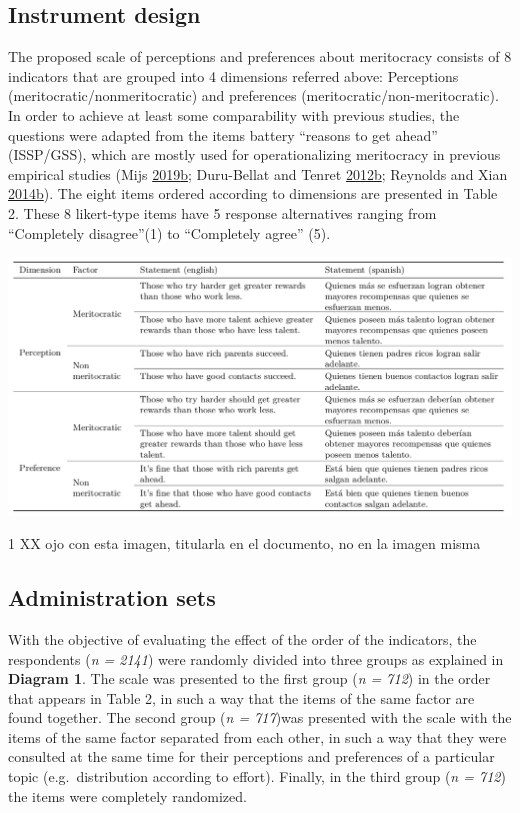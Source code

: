 \documentclass[
]{article}
\begin{document}
\hypertarget{instrument-design}{%
\subsection{Instrument design}\label{instrument-design}}

The proposed scale of perceptions and preferences about meritocracy
consists of 8 indicators that are grouped into 4 dimensions referred
above: Perceptions (meritocratic/nonmeritocratic) and preferences
(meritocratic/non-meritocratic). In order to achieve at least some
comparability with previous studies, the questions were adapted from the
items battery ``reasons to get ahead'' (ISSP/GSS), which are mostly used
for operationalizing meritocracy in previous empirical studies (Mijs
\protect\hyperlink{ref-mijs_paradox_2019}{2019}\protect\hyperlink{ref-mijs_paradox_2019}{b};
Duru-Bellat and Tenret
\protect\hyperlink{ref-duru-bellat_whos_2012}{2012}\protect\hyperlink{ref-duru-bellat_whos_2012}{b};
Reynolds and Xian
\protect\hyperlink{ref-reynolds_perceptions_2014}{2014}\protect\hyperlink{ref-reynolds_perceptions_2014}{b}).
The eight items ordered according to dimensions are presented in Table
2. These 8 likert-type items have 5 response alternatives ranging from
``Completely disagree''(1) to ``Completely agree'' (5).

\includegraphics{../input/images/tabla2.png}

1 XX ojo con esta imagen, titularla en el documento, no en la imagen
misma

\hypertarget{administration-sets}{%
\subsection{Administration sets}\label{administration-sets}}

With the objective of evaluating the effect of the order of the
indicators, the respondents (\emph{n = 2141}) were randomly divided into
three groups as explained in \textbf{Diagram 1}. The scale was presented
to the first group (\emph{n = 712}) in the order that appears in Table
2, in such a way that the items of the same factor are found together.
The second group (\emph{n = 717})was presented with the scale with the
items of the same factor separated from each other, in such a way that
they were consulted at the same time for their perceptions and
preferences of a particular topic (e.g.~distribution according to
effort). Finally, in the third group (\emph{n = 712}) the items were
completely randomized.
\end{document}

